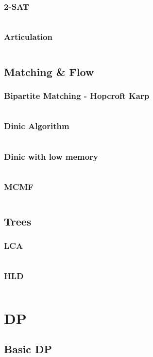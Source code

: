 \documentclass[a4paper,landscape,9pt,twocolumn]{article}
\begin{document}
\subsubsection{2-SAT}
\inputminted{python}{codes/graphs/2sat.py}
\subsubsection{Articulation}
\inputminted{python}{codes/graphs/articulation.py}
\subsection{Matching \& Flow}
\subsubsection{Bipartite Matching - Hopcroft Karp}
\inputminted{python}{codes/graphs/hopcroft.py}
\subsubsection{Dinic Algorithm}
\inputminted{python}{codes/graphs/dinic.py}
\subsubsection{Dinic with low memory}
\inputminted{python}{codes/graphs/dinic_opt.py}
\subsubsection{MCMF}
\inputminted{python}{codes/graphs/mcmf.py}
\subsection{Trees}
\subsubsection{LCA}
\inputminted{python}{codes/graphs/lca.py}
\subsubsection{HLD}
\inputminted{python}{codes/graphs/hld.py}

\section{DP}
\subsection{Basic DP}
\end{document}
